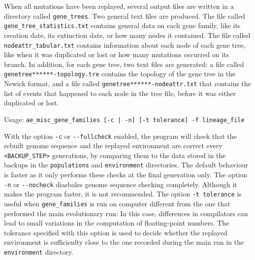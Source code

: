 When all mutations have been replayed, several output files are written in a directory called \verb?gene_trees?. Two general text files are produced. The file called \verb?gene_tree_statistics.txt? contains general data on each gene family, like its creation date, its extinction date, or how many nodes it contained. The file called \verb?nodeattr_tabular.txt? contains information about each node of each gene tree, like when it was duplicated or lost or how many mutations occurred on its branch. In addition, for each gene tree, two text files are generated: a file called \verb?genetree******-topology.tre? contains the topology of the gene tree in the Newick format, and a file called \verb?genetree******-nodeattr.txt? that contains the list of events that happened to each node in the tree file, before it was either duplicated or lost.

Usage: \verb?ae_misc_gene_families [-c | -n] [-t tolerance] -f lineage_file?

With the option \verb?-c? or \verb?--fullcheck? enabled, the program will check that the rebuilt genome sequence and the replayed environment are correct every \verb?<BACKUP_STEP>? generations, by comparing them to the data stored in the backups in the \verb?populations? and \verb?environment? directories. The default behaviour is faster as it only performs these checks at the final generation only. The option \verb?-n? or \verb?--nocheck? diasbales genome sequence checking completely. Although it makes the program faster, it is not recommended. The option \verb?-t tolerance? is useful when \verb?gene_families? is run on computer different from the one that performed the main evolutionary run: In this case, differences in compilators can lead to small variations in the computation of floating-point numbers. The tolerance specified with this option is used to decide whether the replayed environment is sufficienlty close to the one recorded during the main run in the \verb?environment? directory.



\clearemptydoublepage






